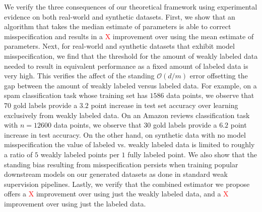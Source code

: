 We verify the three consequences of our theoretical framework using experimental evidence on both real-world and synthetic datasets. First, we show that an algorithm that takes the median estimate of parameters is able to correct misspecification and results in a \textcolor{red}{X} improvement over using the mean estimate of parameters. Next, for real-world and synthetic datasets that exhibit model misspecification, we find that the threshold for the amount of weakly labeled data needed to result in equivalent performance as a fixed amount of labeled data is very high. This verifies the affect of the standing $\mathcal{O}(d/m)$ error offsetting the gap between the amount of weakly labeled versus labeled data. For example, on a spam classification task whose training set has $1586$ data points, we observe that $70$ gold labels provide a $3.2$ point increase in test set accuracy over learning exclusively from weakly labeled data. On an Amazon reviews classification task with $n = 12600$ data points, we observe that $30$ gold labels provide a $6.2$ point increase in test accuracy. On the other hand, on synthetic data with no model misspecification the value of labeled vs. weakly labeled data is limited to roughly a ratio of $5$ weakly labeled points per $1$ fully labeled point. 
We also show that the standing bias resulting from misspecification persists when training popular downstream models on our generated datasets as done in standard weak supervision pipelines. Lastly, we verify that %
the combined estimator we propose offers a \textcolor{red}{X} improvement over using just the weakly labeled data, and a \textcolor{red}{X} improvement over using just the labeled data. %


